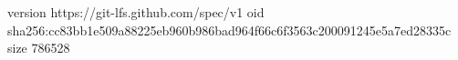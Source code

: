 version https://git-lfs.github.com/spec/v1
oid sha256:cc83bb1e509a88225eb960b986bad964f66c6f3563c200091245e5a7ed28335c
size 786528

